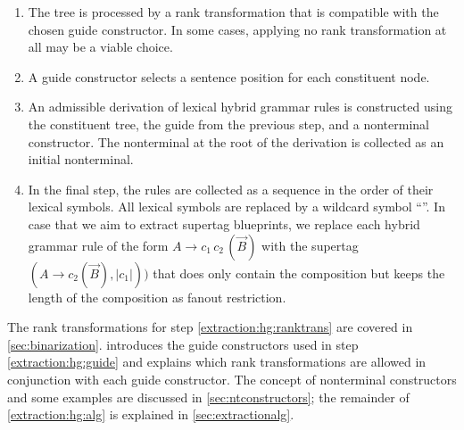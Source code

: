 \documentclass[../../document.tex]{subfiles}
\begin{document}
    \begin{enumerate}
        \item\label{extraction:hg:ranktrans}
            The tree is processed by a rank transformation that is compatible with the chosen guide constructor.
            In some cases, applying no rank transformation at all may be a viable choice.
        \item\label{extraction:hg:guide}
            A guide constructor selects a sentence position for each constituent node.
        \item\label{extraction:hg:alg}
            An admissible derivation of lexical hybrid grammar rules is constructed using the constituent tree, the guide from the previous step, and a nonterminal constructor.
            The  nonterminal at the root of the derivation is collected as an initial nonterminal.
        \item
            In the final step, the rules are collected as a sequence in the order of their lexical symbols.
            All lexical symbols are replaced by a wildcard symbol ``\tn{*}''.
            In case that we aim to extract  supertag blueprints, we replace each hybrid grammar rule of the form \(A \to c_1\,c_2\,(\vec{B})\) with the  supertag \((A \to c_2 (\vec{B}), |c_1|))\) that does only contain the  composition but keeps the length of the  composition as fanout restriction.
    \end{enumerate}
    The rank transformations for step \ref{extraction:hg:ranktrans} are covered in \cref{sec:binarization}.
     introduces the guide constructors used in step \ref{extraction:hg:guide} and explains which rank transformations are allowed in conjunction with each guide constructor.
    The concept of nonterminal constructors and some examples are discussed in \cref{sec:ntconstructors}; the remainder of \cref{extraction:hg:alg} is explained in \cref{sec:extractionalg}.
    

    
    
    

    \ifSubfilesClassLoaded{%
        \printindex
    }{}
\end{document}
